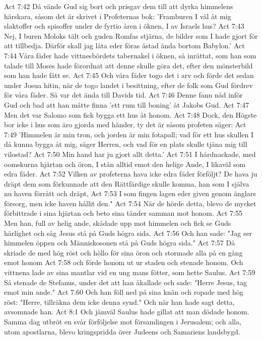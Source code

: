 Act 7:42  Då vände Gud sig bort och prisgav dem till att dyrka himmelens härskara, såsom det är skrivet i Profeternas bok: 'Framburen I väl åt mig slaktoffer och spisoffer under de fyrtio åren i öknen, I av Israels hus?
Act 7:43  Nej, I buren Moloks tält och guden Romfas stjärna, de bilder som I hade gjort för att tillbedja. Därför skall jag låta eder föras åstad ända bortom Babylon.'
Act 7:44  Våra fäder hade vittnesbördets tabernakel i öknen, så inrättat, som han som talade till Moses hade förordnat att denne skulle göra det, efter den mönsterbild som han hade fått se.
Act 7:45  Och våra fäder togo det i arv och förde det sedan under Josua hitin, när de togo landet i besittning, efter de folk som Gud fördrev för våra fäder. Så var det ända till Davids tid.
Act 7:46  Denne fann nåd inför Gud och bad att han måtte finna 'ett rum till boning' åt Jakobs Gud.
Act 7:47  Men det var Salomo som fick bygga ett hus åt honom.
Act 7:48  Dock, den Högste bor icke i hus som äro gjorda med händer, ty det är såsom profeten säger:
Act 7:49  'Himmelen är min tron, och jorden är min fotapall; vad för ett hus skullen I då kunna bygga åt mig, säger Herren, och vad för en plats skulle tjäna mig till vilostad?
Act 7:50  Min hand har ju gjort allt detta.'
Act 7:51  I hårdnackade, med oomskurna hjärtan och öron, I stån alltid emot den helige Ande, I likaväl som edra fäder.
Act 7:52  Vilken av profeterna hava icke edra fäder förföljt? De hava ju dräpt dem som förkunnade att den Rättfärdige skulle komma, han som I själva nu haven förrått och dräpt,
Act 7:53  I som fingen lagen eder given genom änglars försorg, men icke haven hållit den."
Act 7:54  När de hörde detta, blevo de mycket förbittrade i sina hjärtan och beto sina tänder samman mot honom.
Act 7:55  Men han, full av helig ande, skådade upp mot himmelen och fick se Guds härlighet och såg Jesus stå på Guds högra sida.
Act 7:56  Och han sade: "Jag ser himmelen öppen och Människosonen stå på Guds högra sida."
Act 7:57  Då skriade de med hög röst och höllo för sina öron och stormade alla på en gång emot honom
Act 7:58  och förde honom ut ur staden och stenade honom. Och vittnena lade av sina mantlar vid en ung mans fötter, som hette Saulus.
Act 7:59  Så stenade de Stefanus, under det att han åkallade och sade: "Herre Jesus, tag emot min ande."
Act 7:60  Och han föll ned på sina knän och ropade med hög röst: "Herre, tillräkna dem icke denna synd." Och när han hade sagt detta, avsomnade han.
Act 8:1  Och jämväl Saulus hade gillat att man dödade honom. Samma dag utbröt en svår förföljelse mot församlingen i Jerusalem; och alla, utom apostlarna, blevo kringspridda över Judeens och Samariens landsbygd.
